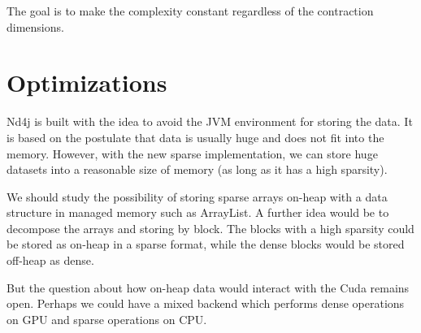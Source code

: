 The goal is to make the complexity constant regardless of the contraction dimensions.


\section{Optimizations}
Nd4j is built with the idea to avoid the JVM environment for storing the data. It is based on the postulate that data is usually huge and does not fit into the memory. However, with the new sparse implementation, we can store huge datasets into a reasonable size of memory (as long as it has a high sparsity).

We should study the possibility of storing sparse arrays on-heap with a data structure in managed memory such as ArrayList. A further idea would be to decompose the arrays and storing by block. The blocks with a high sparsity could be stored as on-heap in a sparse format, while the dense blocks would be stored off-heap as dense.

But the question about how on-heap data would interact with the Cuda remains open. Perhaps we could have a mixed backend which performs dense operations on GPU and sparse operations on CPU.
